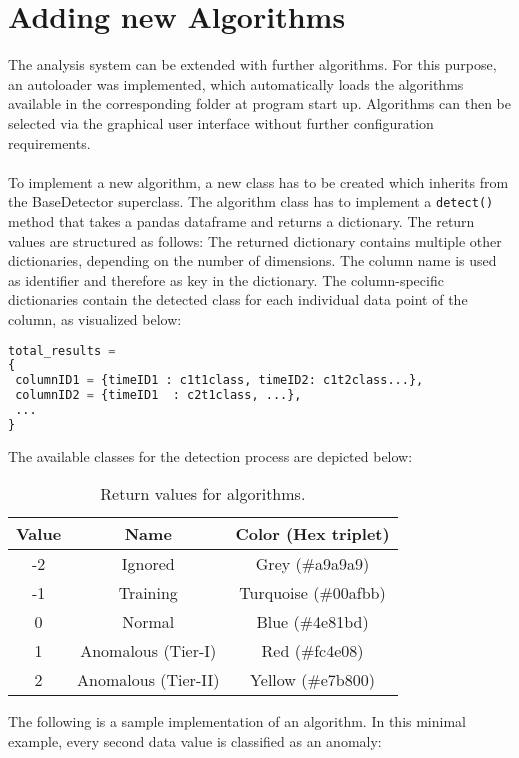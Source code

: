 
\chapter{Adding new Algorithms}
The analysis system can be extended with further algorithms. For this purpose, an autoloader was implemented, which automatically loads the algorithms available in the corresponding folder at program start up. Algorithms can then be selected via the graphical user interface without further configuration requirements.\\
\\
To implement a new algorithm, a new class has to be created which inherits from the BaseDetector superclass. The algorithm class has to implement a \texttt{detect()} method that takes a pandas dataframe and returns a dictionary. The return values are structured as follows: The returned dictionary contains multiple other dictionaries, depending on the number of dimensions. The column name is used as identifier and therefore as key in the dictionary. The column-specific dictionaries contain the detected class for each individual data point of the column, as visualized below:\\
\begin{lstlisting}[language=python,caption=Structure of the return dictionary.]
total_results = 
{
 columnID1 = {timeID1 : c1t1class, timeID2: c1t2class...},
 columnID2 = {timeID1  : c2t1class, ...},
 ...
}
\end{lstlisting}
The available classes for the detection process are depicted below:
\begin{table}[H]
  \begin{center}
  \caption{Return values for algorithms.}\label{tab:return_values}
  \begin{tabular}{ccc} \hline
  Value & Name & Color (Hex triplet) \\ \hline
  -2 & Ignored & Grey (\#a9a9a9) \\
  -1 & Training & Turquoise (\#00afbb) \\
  0 & Normal & Blue (\#4e81bd)  \\
  1 & Anomalous (Tier-I) & Red (\#fc4e08) \\
  2 & Anomalous (Tier-II) & Yellow (\#e7b800)  \\ \hline
  \end{tabular}
  \end{center}
  \end{table}
The following is a sample implementation of an algorithm. In this minimal example, every second data value is classified as an anomaly:
